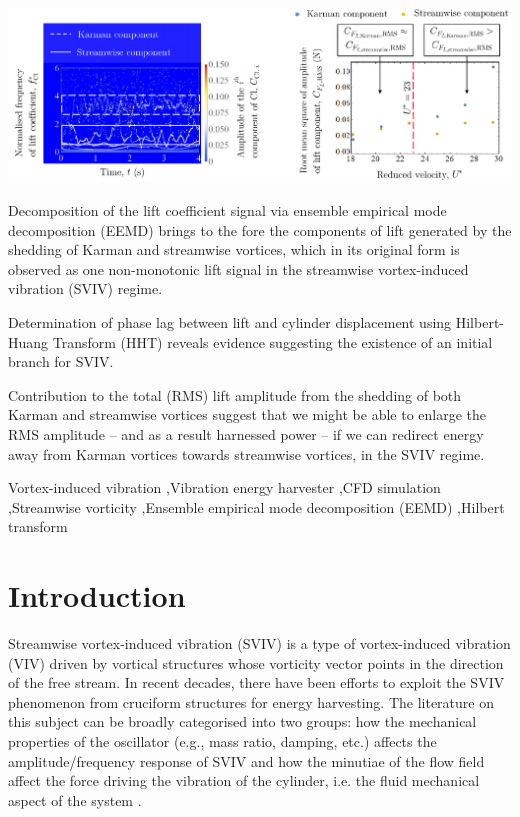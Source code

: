 \documentclass[a4paper,fleqn]{cas-sc}
\begin{document}
\begin{graphicalabstract}
  \includegraphics[width=1\textwidth]{figs/graphicalAbstract}
\end{graphicalabstract}

\begin{highlights}
\item Decomposition of the lift coefficient signal via ensemble empirical mode decomposition (EEMD) brings to the fore the components of lift generated by the shedding of Karman and streamwise vortices, which in its original form is observed as one non-monotonic lift signal in the streamwise vortex-induced vibration (SVIV) regime.
\item Determination of phase lag between lift and cylinder displacement using Hilbert-Huang Transform (HHT) reveals evidence suggesting the existence of an initial branch for SVIV.
\item Contribution to the total \rms{} (RMS) lift amplitude from the shedding of both Karman and streamwise vortices suggest that we might be able to enlarge the RMS amplitude -- and as a result harnessed power -- if we can redirect energy away from Karman vortices towards streamwise vortices, in the SVIV regime.
\end{highlights}

\begin{keywords}
  Vortex-induced vibration \sep Vibration energy harvester \sep CFD simulation \sep Streamwise vorticity \sep Ensemble empirical mode decomposition (EEMD) \sep Hilbert transform
\end{keywords}


\maketitle

\doublespacing

\section{Introduction} \label{sec:intro}
Streamwise vortex-induced vibration (SVIV) is a type of vortex-induced vibration (VIV) driven by vortical structures whose vorticity vector points in the direction of the free stream. In recent decades, there have been efforts to exploit the SVIV phenomenon from cruciform structures for energy harvesting. The literature on this subject can be broadly categorised into two groups: how the mechanical properties of the oscillator (e.g., mass ratio, damping, etc.) affects the amplitude/frequency response of SVIV \citep{Koide2009,Koide2013,Nguyen2012} and how the minutiae of the flow field affect the force driving the vibration of the cylinder, i.e. the fluid mechanical aspect of the system \citep{Deng2007,Koide2017,Zhao2018a}.
\end{document}
